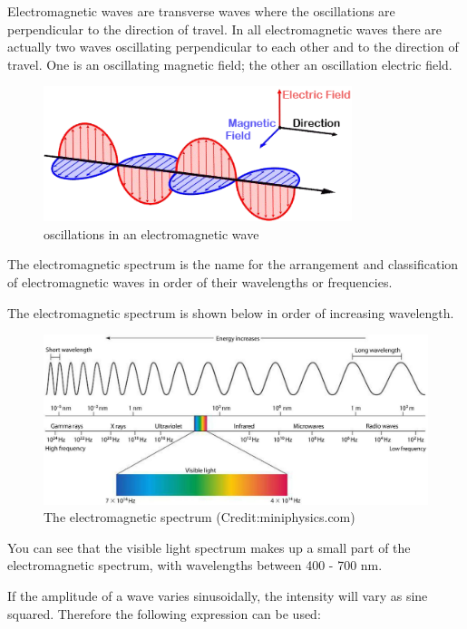 \documentclass[main.tex]{subfiles}
\begin{document}
Electromagnetic waves are transverse waves where the oscillations are perpendicular to the direction of travel. In all electromagnetic waves there are actually two waves oscillating perpendicular to each other and to the direction of travel. One is an oscillating magnetic field; the other an oscillation electric field.

\begin{figure}[h!]
\includegraphics[width=9cm]{figs/chapt-6/emwave.png}
\centering
\caption{oscillations in an electromagnetic wave}
\label{emwave}
\end{figure}

The electromagnetic spectrum is the name for the arrangement and classification of electromagnetic waves in order of their wavelengths or frequencies.

The electromagnetic spectrum is shown below in order of increasing wavelength.

\begin{figure}[h]
\includegraphics[width=\textwidth]{figs/chapt-6/emspectrum.jpg}
\caption{The electromagnetic spectrum (Credit:miniphysics.com)}
\end{figure}

You can see that the visible light spectrum makes up a small part of the electromagnetic spectrum, with wavelengths between 400 - 700 nm.


If the amplitude of a wave varies sinusoidally, the intensity will vary as sine squared. Therefore the following expression can be used:
\end{document}
